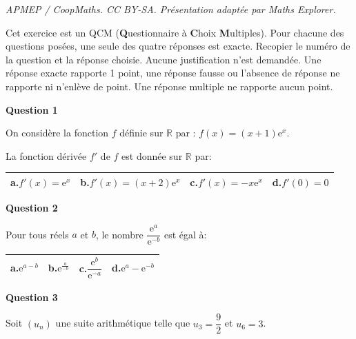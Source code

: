 \documentclass[10pt]{article}
\providecommand{\R}{\mathbb{R}}
\providecommand{\e}{{\mathrm{e}}}
\begin{document}
\noindent\textit{APMEP / CoopMaths. CC BY-SA. Présentation adaptée par Maths Explorer.}\par\medskip
\bigskip

Cet exercice est un QCM (\textbf{Q}uestionnaire à \textbf{C}hoix \textbf{M}ultiples). Pour chacune des questions posées, une seule des quatre réponses est exacte. Recopier le numéro de la question et la réponse choisie. Aucune justification n'est demandée. Une réponse exacte rapporte 1 point, une réponse fausse ou l'absence de réponse ne rapporte ni n'enlève de point. Une réponse multiple ne rapporte aucun point.

\bigskip

\textbf{Question 1}

\medskip

On considère la fonction $f$ définie sur $\R$ par : $f(x)= (x+1)\e^{x}$.

La fonction dérivée $f'$ de $f$ est donnée sur $\R$ par:

\begin{center}
{\renewcommand{\arraystretch}{1.5}
\begin{tabularx}{\linewidth}{|X|X|X|X|}
\hline
\textbf{a.}\quad $f'(x)=\e^{x}$ & \textbf{b.}\quad $f'(x)=(x+2)\e^{x}$ 
& \textbf{c.}\quad $f'(x)=-x\e^{x}$   & \textbf{d.}\quad $f'(0)=0$\\
\hline
\end{tabularx}}
\end{center}

\medskip

\textbf{Question 2}

\medskip

Pour tous réels $a$ et $b$, le nombre $\dfrac{\e^{a}}{\e^{-b}}$ est égal à:

\begin{center}
{\renewcommand{\arraystretch}{1}
\begin{tabularx}{\linewidth}{|X|X|X|X|}
\hline
\textbf{a.}\quad $\e^{a-b}$ & \textbf{b.}\quad $\e^{\frac{a}{-b}}$ 
& \textbf{c.}\quad $\dfrac{\e^{b}}{\e^{-a}}$  \rule[-10pt]{0pt}{27pt} & \textbf{d.}\quad $\e^{a}-\e^{-b}$\\
\hline
\end{tabularx}}
\end{center}

\medskip

\textbf{Question 3}

\medskip

Soit $\left(u_n\right)$  une suite arithmétique telle que $u_3= \dfrac{9}{2}$ et $u_6=3$.
\end{document}
